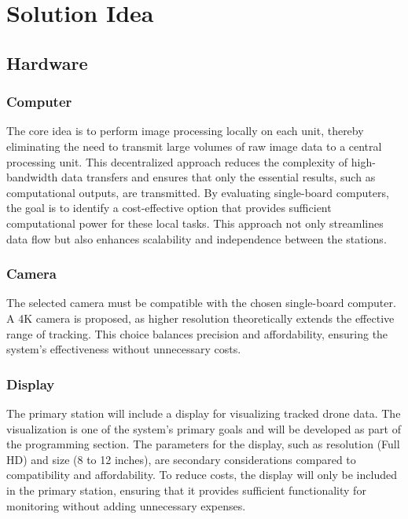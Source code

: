 \chapter{Solution Idea}

\section{Hardware}

\subsection{Computer}
The core idea is to perform image processing locally on each unit, thereby eliminating the need to transmit large volumes of raw image data to a central processing unit. This decentralized approach reduces the complexity of high-bandwidth data transfers and ensures that only the essential results, such as computational outputs, are transmitted. By evaluating single-board computers, the goal is to identify a cost-effective option that provides sufficient computational power for these local tasks. This approach not only streamlines data flow but also enhances scalability and independence between the stations.

\subsection{Camera}
The selected camera must be compatible with the chosen single-board computer. A 4K camera is proposed, as higher resolution theoretically extends the effective range of tracking. This choice balances precision and affordability, ensuring the system's effectiveness without unnecessary costs.

\subsection{Display}
The primary station will include a display for visualizing tracked drone data. The visualization is one of the system's primary goals and will be developed as part of the programming section. The parameters for the display, such as resolution (Full HD) and size (8 to 12 inches), are secondary considerations compared to compatibility and affordability. To reduce costs, the display will only be included in the primary station, ensuring that it provides sufficient functionality for monitoring without adding unnecessary expenses.

